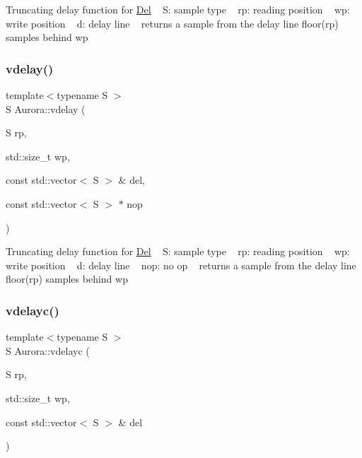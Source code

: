 Truncating delay function for \hyperlink{class_aurora_1_1_del}{Del} ~\newline
S\+: sample type ~\newline
rp\+: reading position ~\newline
wp\+: write position ~\newline
d\+: delay line ~\newline
returns a sample from the delay line floor(rp) samples behind wp \mbox{\label{namespace_aurora_addae9c1b83fcfd6ee11bbbe5a4d3d329}} 
\subsubsection{\texorpdfstring{vdelay()}{vdelay()}\hspace{0.1cm}{\footnotesize\ttfamily [2/2]}}
{\footnotesize\ttfamily template$<$typename S $>$ \\
S Aurora\+::vdelay (\begin{DoxyParamCaption}\item[{S}]{rp,  }\item[{std\+::size\+\_\+t}]{wp,  }\item[{const std\+::vector$<$ S $>$ \&}]{del,  }\item[{const std\+::vector$<$ S $>$ $\ast$}]{nop }\end{DoxyParamCaption})\hspace{0.3cm}{\ttfamily [inline]}}

Truncating delay function for \hyperlink{class_aurora_1_1_del}{Del} ~\newline
S\+: sample type ~\newline
rp\+: reading position ~\newline
wp\+: write position ~\newline
d\+: delay line ~\newline
nop\+: no op ~\newline
returns a sample from the delay line floor(rp) samples behind wp \mbox{\label{namespace_aurora_ac522d6f69ef7018efa8ac07fd26ad057}} 
\subsubsection{\texorpdfstring{vdelayc()}{vdelayc()}\hspace{0.1cm}{\footnotesize\ttfamily [1/2]}}
{\footnotesize\ttfamily template$<$typename S $>$ \\
S Aurora\+::vdelayc (\begin{DoxyParamCaption}\item[{S}]{rp,  }\item[{std\+::size\+\_\+t}]{wp,  }\item[{const std\+::vector$<$ S $>$ \&}]{del }\end{DoxyParamCaption})}

